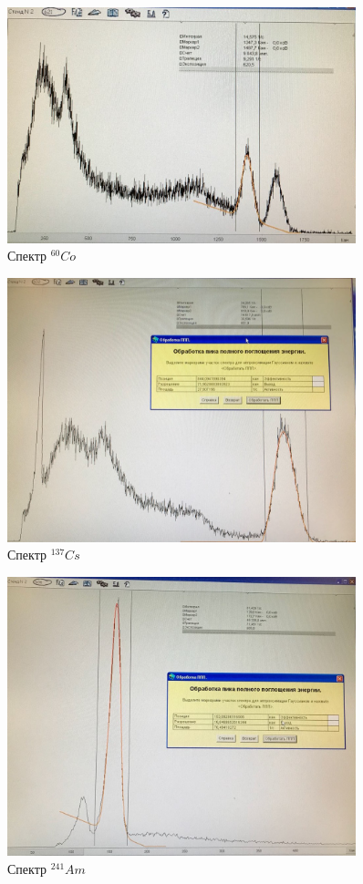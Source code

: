 \documentclass[a4paper,12pt]{article}
\begin{document}
	\newpage
	 \begin{figure}[h!]
	 	\centering
	 	\includegraphics[width=0.9\textwidth]{Co.jpg}
	 	\caption{Спектр $^{60}Co$}
	 \end{figure}
	 
	 \begin{figure}[h!]
	 	\centering
	 	\includegraphics[width=0.9\textwidth]{Cs.jpg}
	 	\caption{Спектр $^{137}Cs$}
	 \end{figure}
	 
	 	 \begin{figure}[h!]
	 	 	\centering
	 	 	\includegraphics[width=0.9\textwidth]{Am.jpg}
	 	 	\caption{Спектр $^{241}Am$}
	 	 \end{figure}
	 	 
\end{document}
